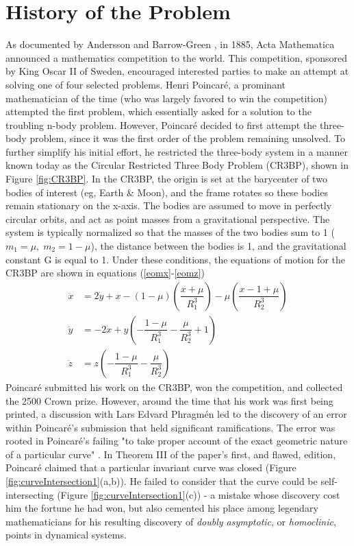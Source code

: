 \documentclass[12pt]{article} %
\begin{document}
\section*{History of the Problem} %
As documented by Andersson and Barrow-Green \cite{Andersson1994,BarrowGreen1994}, in 1885, Acta Mathematica announced a mathematics competition to the world. This competition, sponsored by King Oscar II of Sweden, encouraged interested parties to make an attempt at solving one of four selected problems. Henri Poincaré, a prominant mathematician of the time (who was largely favored to win the competition) attempted the first problem, which essentially asked for a solution to the troubling n-body problem. However, Poincaré decided to first attempt the three-body problem, since it was the first order of the problem remaining unsolved. To further simplify his initial effort, he restricted the three-body system in a manner known today as the Circular Restricted Three Body Problem (CR3BP), shown in Figure \ref{fig:CR3BP}. In the CR3BP, the origin is set at the barycenter of two bodies of interest (eg, Earth \& Moon), and the frame rotates so these bodies remain stationary on the x-axis. The bodies are assumed to move in perfectly circular orbits, and act as point masses from a gravitational perspective. The system is typically normalized so that the masses of the two bodies sum to 1 ($m_1 = \mu,\; m_2 = 1-\mu$), the distance between the bodies is 1, and the gravitational constant G is equal to 1. Under these conditions, the equations of motion for the CR3BP are shown in equations (\ref{eomx}-\ref{eomz})
\begin{align}
\ddot{x} &=  2\dot{y} + x - (1-\mu)\left(\dfrac{x+\mu}{R_1^3}\right) - \mu\left(\dfrac{x-1+\mu}{R_2^3}\right) \label{eomx}\\
\ddot{y} &= - 2\dot{x} + y\left(-\dfrac{1-\mu}{R_1^3} - \dfrac{\mu}{R_2^3} + 1\right) \label{eomy}\\
\ddot{z} &= z\left(-\dfrac{1 - \mu}{R_1^3} - \dfrac{\mu}{R_2^3}\right) \label{eomz}
\end{align}
Poincaré submitted his work on the CR3BP, won the competition, and collected the 2500 Crown prize. However, around the time that his work was first being printed, a discussion with Lars Edvard Phragmén led to the discovery of an error within Poincaré's submission that held significant ramifications. The error was rooted in Poincaré's failing "to take proper account of the exact geometric nature of a particular curve" \cite{BarrowGreen1997}. In Theorem III of the paper's first, and flawed, edition, Poincaré claimed that a particular invariant curve was closed (Figure \ref{fig:curveIntersection1}(a,b)). He failed to consider that the curve could be self-intersecting (Figure \ref{fig:curveIntersection1}(c)) - a mistake whose discovery cost him the fortune he had won, but also cemented his place among legendary mathematicians for his resulting discovery of \textit{doubly asymptotic}, or \textit{homoclinic}, points in dynamical systems.
\end{document}
